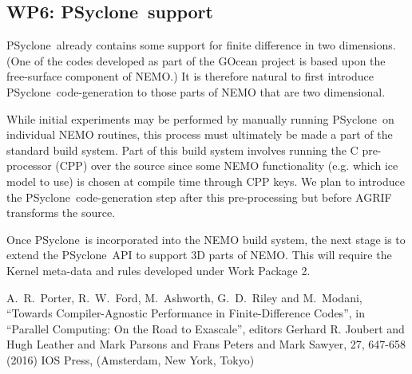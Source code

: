 \documentclass{article}
\newcommand{\psyclone}{{PS}yclone}
\begin{document}
\subsection{WP6: \psyclone\ support}
\label{wp6_autogen}

\psyclone\ already contains some support for finite difference in two
dimensions.  (One of the codes developed as part of the GOcean project
is based upon the free-surface component of NEMO.) It is therefore
natural to first introduce \psyclone\ code-generation to those parts of NEMO
that are two dimensional.

While initial experiments may be performed by manually running
\psyclone\ on individual NEMO routines, this process must ultimately be
made a part of the standard build system. Part of this build system
involves running the C pre-processor (CPP) over the source since some
NEMO functionality (e.g. which ice model to use) is chosen at compile
time through CPP keys. We plan to introduce the \psyclone\
code-generation step after this pre-processing but before AGRIF
transforms the source.

Once \psyclone\ is incorporated into the NEMO build system, the next
stage is to extend the \psyclone\ API to support 3D parts of NEMO.  This
will require the Kernel meta-data and rules developed under Work
Package 2.

\begin{thebibliography}{1}

 A.~R.~Porter, R.~W.~Ford, M.~Ashworth, G.~D.~Riley and M.~Modani, ``Towards Compiler-Agnostic Performance in Finite-Difference Codes'', in ``Parallel Computing: On the Road to Exascale'', editors Gerhard R. Joubert and Hugh Leather and Mark Parsons and Frans Peters and Mark Sawyer, 27, 647-658 (2016) IOS Press, (Amsterdam, New York, Tokyo)

\end{thebibliography}
\end{document}
